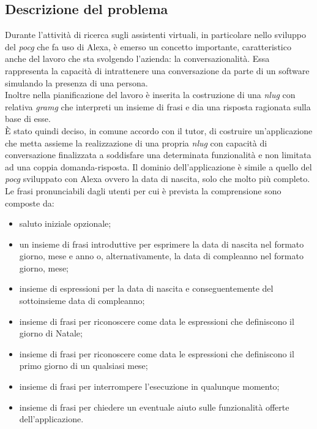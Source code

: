 	\subsection{Descrizione del problema}
	Durante l'attività di ricerca sugli assistenti virtuali, in particolare nello sviluppo del \emph{\gls{pocg}} che fa uso di Alexa, è emerso un concetto importante, caratteristico anche del lavoro che sta svolgendo l'azienda: la conversazionalità. Essa rappresenta la capacità di intrattenere una conversazione da parte di un software simulando la presenza di una persona. \\
	Inoltre nella pianificazione del lavoro è inserita la costruzione di una \emph{\gls{nlug}} con relativa \emph{\gls{gramg}} che interpreti un insieme di frasi e dia una risposta ragionata sulla base di esse. \\
	È stato quindi deciso, in comune accordo con il tutor, di costruire un'applicazione che metta assieme la realizzazione di una propria \emph{\gls{nlug}} con capacità di conversazione finalizzata a soddisfare una determinata funzionalità e non limitata ad una coppia domanda-risposta. Il dominio dell'applicazione è simile a quello del \emph{\gls{pocg}} sviluppato con Alexa ovvero la data di nascita, solo che molto più completo. Le frasi pronunciabili dagli utenti per cui è prevista la comprensione sono  composte da:
	\begin{itemize}
		\item saluto iniziale opzionale;
		\item un insieme di frasi introduttive per esprimere la data di nascita nel formato giorno, mese e anno o, alternativamente, la data di compleanno nel formato giorno, mese;
		\item insieme di espressioni per la data di nascita e conseguentemente del sottoinsieme data di compleanno;
		\item insieme di frasi per riconoscere come data le espressioni che definiscono il giorno di Natale;
		\item insieme di frasi per riconoscere come data le espressioni che definiscono il primo giorno di un qualsiasi mese;
		\item insieme di frasi per interrompere l'esecuzione in qualunque momento;
		\item insieme di frasi per chiedere un eventuale aiuto sulle funzionalità offerte dell'applicazione.
	\end{itemize}
